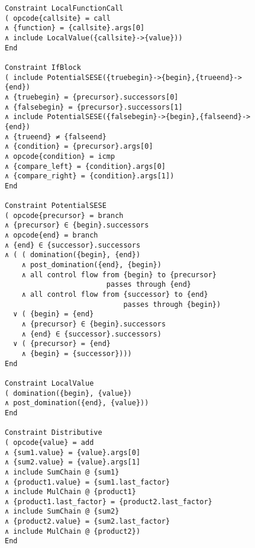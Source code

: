 \begin{figure}[p]
\begin{lstlisting}[language=IDL,basicstyle=\linespread{0.8}\small\ttfamily,
                   firstnumber=154]
Constraint LocalFunctionCall
( opcode{callsite} = call
∧ {function} = {callsite}.args[0]
∧ include LocalValue({callsite}->{value}))
End

Constraint IfBlock
( include PotentialSESE({truebegin}->{begin},{trueend}->{end})
∧ {truebegin} = {precursor}.successors[0]
∧ {falsebegin} = {precursor}.successors[1]
∧ include PotentialSESE({falsebegin}->{begin},{falseend}->{end})
∧ {trueend} ≠ {falseend}
∧ {condition} = {precursor}.args[0]
∧ opcode{condition} = icmp
∧ {compare_left} = {condition}.args[0]
∧ {compare_right} = {condition}.args[1])
End

Constraint PotentialSESE
( opcode{precursor} = branch
∧ {precursor} ∈ {begin}.successors
∧ opcode{end} = branch
∧ {end} ∈ {successor}.successors
∧ ( ( domination({begin}, {end})
    ∧ post_domination({end}, {begin})
    ∧ all control flow from {begin} to {precursor}
                        passes through {end}
    ∧ all control flow from {successor} to {end}
                            passes through {begin})
  ∨ ( {begin} = {end}
    ∧ {precursor} ∈ {begin}.successors
    ∧ {end} ∈ {successor}.successors)
  ∨ ( {precursor} = {end}
    ∧ {begin} = {successor})))
End

Constraint LocalValue
( domination({begin}, {value})
∧ post_domination({end}, {value}))
End

Constraint Distributive
( opcode{value} = add
∧ {sum1.value} = {value}.args[0]
∧ {sum2.value} = {value}.args[1]
∧ include SumChain @ {sum1}
∧ {product1.value} = {sum1.last_factor}
∧ include MulChain @ {product1}
∧ {product1.last_factor} = {product2.last_factor}
∧ include SumChain @ {sum2}
∧ {product2.value} = {sum2.last_factor}
∧ include MulChain @ {product2})
End
\end{lstlisting}
\end{figure}
